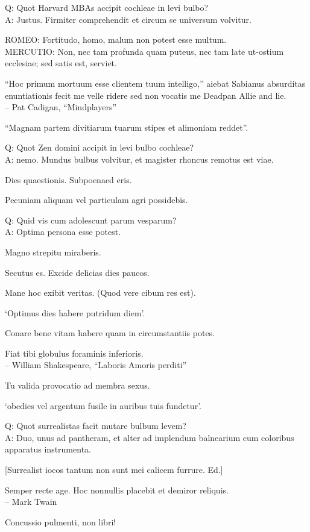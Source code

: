\documentclass[titlepage,12pt]{memoir}
\begin{document}
Q: Quot Harvard MBAs accipit cochleae in levi bulbo?\\
A: Justus. Firmiter comprehendit et circum se universum volvitur.

ROMEO: Fortitudo, homo, malum non potest esse multum.\\
MERCUTIO: Non, nec tam profunda quam puteus, nec tam late
ut-ostium ecclesiae; sed satis est, serviet.

 “Hoc primum mortuum esse clientem tuum intelligo,” aiebat Sabianus
absurditas enuntiationis fecit me velle ridere sed non vocatis me
Deadpan Allie and lie.
\\-- Pat Cadigan, “Mindplayers”

“Magnam partem divitiarum tuarum stipes et alimoniam reddet”.

Q: Quot Zen domini accipit in levi bulbo cochleae?\\
A: nemo. Mundus bulbus volvitur, et magister rhoncus remotus est
viae.

Dies quaestionis. Subpoenaed eris.

 Pecuniam aliquam vel particulam agri possidebis.

Q: Quid vis cum adolescunt parum vesparum?\\
A: Optima persona esse potest.

Magno strepitu miraberis.

Secutus es. Excide delicias dies paucos.

Mane hoc exibit veritas. (Quod vere cibum res est).

‘Optimus dies habere putridum diem’.

Conare bene vitam habere quam in circumstantiis potes.

Fiat tibi globulus foraminis inferioris.
\\-- William Shakespeare, “Laboris Amoris perditi”

Tu valida provocatio ad membra sexus.

‘obedies vel argentum fusile in auribus tuis fundetur’.

Q: Quot surrealistas facit mutare bulbum levem?\\
A: Duo, unus ad pantheram, et alter ad implendum balnearium
cum coloribus apparatus instrumenta.

[Surrealist iocos tantum non sunt mei calicem furrure. Ed.]

Semper recte age. Hoc nonnullis placebit et demiror reliquis.
\\-- Mark Twain

Concussio pulmenti, non libri!
\end{document}
